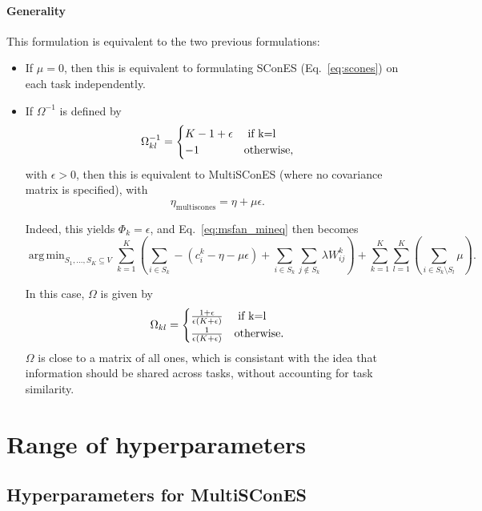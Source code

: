 \documentclass[12pt,a4paper]{article}
\newcommand{\sset}{S}
\newcommand{\vset}{V}
\DeclareMathOperator*{\argmin}{arg\,min}
\begin{document}
\paragraph{Generality}
This formulation is equivalent to the two previous formulations:
\begin{itemize}
\item If $\mu=0$, then this is equivalent to formulating SConES (Eq.~\ref{eq:scones}) on each task independently.
\item If $\Omega^{-1}$ is defined by 
  \[
  \Omega_{kl}^{-1} = 
  \begin{cases}
     K - 1 + \epsilon & \mbox{ if } $k=l$ \\
     -1 & \mbox{otherwise},
  \end{cases}
  \]
 with $\epsilon > 0$, then this is equivalent to MultiSConES (where no covariance matrix is specified), 
with \[
\eta_{\mbox{multiscones}} = \eta + \mu \epsilon.
\]

Indeed, this yields $\Phi_k = \epsilon$, and Eq.~\ref{eq:msfan_mineq} then becomes
\[
  \argmin_{\sset_1, \ldots, \sset_K \subseteq \vset} \sum_{k=1}^K \left(
    \sum_{i \in \sset_k} - \left(c_i^k - \eta - \mu \epsilon \right) + 
    \sum_{i \in \sset_k} \sum_{j \notin \sset_k} \lambda W_{ij}^k \right) + 
  \sum_{k=1}^K \sum_{l=1}^K \left( \sum_{i \in \sset_k \setminus \sset_l} \mu \right).
\]

In this case, $\Omega$ is given by 
  \[
  \Omega_{kl} = 
  \begin{cases}
     \frac{1 + \epsilon}{\epsilon (K+\epsilon)} & \mbox{ if } $k=l$ \\
     \frac{1}{\epsilon (K+\epsilon)} & \mbox{otherwise}.
  \end{cases}
  \]
 $\Omega$ is close to a matrix of all ones, which is consistant with the idea that information should be shared across tasks, without accounting for task similarity.

\end{itemize}


\section{Range of hyperparameters}

\subsection{Hyperparameters for MultiSConES}
\end{document}
